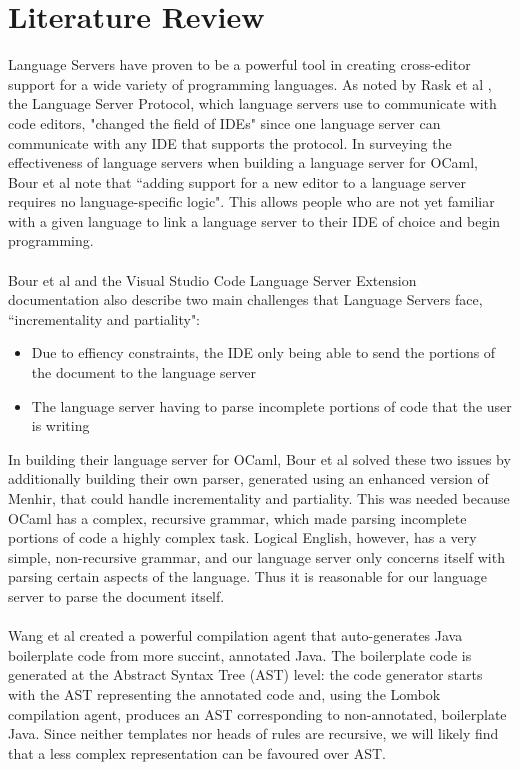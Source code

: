 \documentclass[../main.tex]{subfiles}
\begin{document}
\section*{Literature Review}

Language Servers have proven to be a powerful tool in creating cross-editor support for a wide variety of programming languages. As noted by Rask et al \cite[]{standardised_lsp_extensions}, the Language Server Protocol, which language servers use to communicate with code editors, "changed the field of IDEs" since one language server can communicate with any IDE that supports the protocol. In surveying the effectiveness of language servers when building a language server for OCaml, Bour et al \cite[]{merlin_experience_report} note that ``adding support for a new editor to a language server requires no language-specific logic". This allows people who are not yet familiar with a given language to link a language server to their IDE of choice and begin programming. 
\\ \\
Bour et al \cite[]{merlin_experience_report} and the Visual Studio Code Language Server Extension documentation \cite[]{vsc_langserver_docs} also describe two main challenges that Language Servers face, ``incrementality and partiality":
\begin{itemize}
    \item Due to effiency constraints, the IDE only being able to send the portions of the document to the language server
    \item The language server having to parse incomplete portions of code that the user is writing
\end{itemize}
In building their language server for OCaml, Bour et al solved these two issues by additionally building their own parser, generated using an enhanced version of Menhir, that could handle incrementality and partiality. This was needed because OCaml has a complex, recursive grammar, which made parsing incomplete portions of code a highly complex task. Logical English, however, has a very simple, non-recursive grammar, and our language server only concerns itself with parsing certain aspects of the language. Thus it is reasonable for our language server to parse the document itself.
\\ \\
Wang et al \cite[]{classless_java} created a powerful compilation agent that auto-generates Java boilerplate code from more succint, annotated Java. The boilerplate code is generated at the Abstract Syntax Tree (AST) level: the code generator starts with the AST representing the annotated code and, using the Lombok compilation agent, produces an AST corresponding to non-annotated, boilerplate Java. Since neither templates nor heads of rules are recursive, we will likely find that a less complex representation can be favoured over AST.
\end{document}
